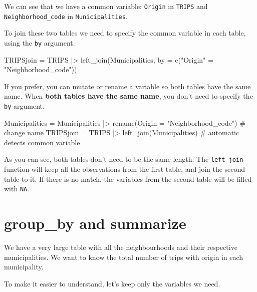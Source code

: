 \documentclass[
  letterpaper,
  DIV=11,
  numbers=noendperiod]{scrreprt}
\newenvironment{Shaded}{\begin{snugshade}}{\end{snugshade}}
\newcommand{\AttributeTok}[1]{\textcolor[rgb]{0.40,0.45,0.13}{#1}}
\newcommand{\CommentTok}[1]{\textcolor[rgb]{0.37,0.37,0.37}{#1}}
\newcommand{\FunctionTok}[1]{\textcolor[rgb]{0.28,0.35,0.67}{#1}}
\newcommand{\NormalTok}[1]{\textcolor[rgb]{0.00,0.23,0.31}{#1}}
\newcommand{\OtherTok}[1]{\textcolor[rgb]{0.00,0.23,0.31}{#1}}
\newcommand{\SpecialCharTok}[1]{\textcolor[rgb]{0.37,0.37,0.37}{#1}}
\newcommand{\StringTok}[1]{\textcolor[rgb]{0.13,0.47,0.30}{#1}}
\begin{document}
We can see that we have a common variable: \texttt{Origin} in
\texttt{TRIPS} and \texttt{Neighborhood\_code} in
\texttt{Municipalities}.

To join these two tables we need to specify the common variable in each
table, using the \texttt{by} argument.

\begin{Shaded}
\begin{Highlighting}[]
\NormalTok{TRIPSjoin }\OtherTok{=}\NormalTok{ TRIPS }\SpecialCharTok{|\textgreater{}} \FunctionTok{left\_join}\NormalTok{(Municipalities, }\AttributeTok{by =} \FunctionTok{c}\NormalTok{(}\StringTok{"Origin"} \OtherTok{=} \StringTok{"Neighborhood\_code"}\NormalTok{))}
\end{Highlighting}
\end{Shaded}

If you prefer, you can mutate or rename a variable so both tables have
the same name. When \textbf{both tables have the same name}, you don't
need to specify the \texttt{by} argument.

\begin{Shaded}
\begin{Highlighting}[]
\NormalTok{Municipalities }\OtherTok{=}\NormalTok{ Municipalities }\SpecialCharTok{|\textgreater{}} \FunctionTok{rename}\NormalTok{(}\AttributeTok{Origin =} \StringTok{"Neighborhood\_code"}\NormalTok{) }\CommentTok{\# change name}
\NormalTok{TRIPSjoin }\OtherTok{=}\NormalTok{ TRIPS }\SpecialCharTok{|\textgreater{}} \FunctionTok{left\_join}\NormalTok{(Municipalities) }\CommentTok{\# automatic detects common variable}
\end{Highlighting}
\end{Shaded}

As you can see, both tables don't need to be the same length. The
\texttt{left\_join} function will keep all the observations from the
first table, and join the second table to it. If there is no match, the
variables from the second table will be filled with \texttt{NA}.

\section{group\_by and summarize}\label{group_by-and-summarize}

We have a very large table with all the neighbourhoods and their
respective municipalities. We want to know the total number of trips
with origin in each municipality.

To make it easier to understand, let's keep only the variables we need.
\end{document}
